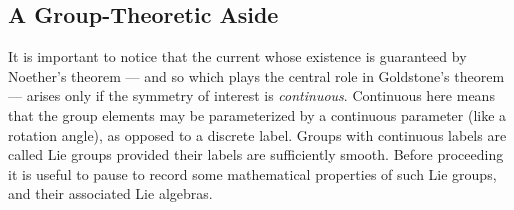 \documentclass[12pt]{report}
\begin{document}
\subsection{A Group-Theoretic Aside}

It is important to notice that the current whose existence
is guaranteed by Noether's theorem --- and so which plays
the central role in Goldstone's theorem --- arises only
if the symmetry of interest is {\it continuous}. Continuous
here means that the group elements may be parameterized 
by a continuous parameter (like a rotation angle), as opposed
to a discrete label. Groups with continuous labels are
called Lie groups provided their labels are sufficiently
smooth. Before proceeding it is useful to pause to 
record some mathematical properties of such 
Lie groups, and their associated Lie algebras. 
\end{document}
